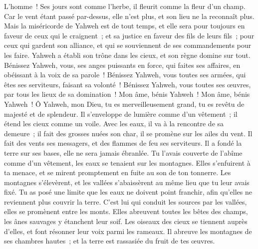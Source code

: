 \begin{multicols}{2}
L'homme~! Ses jours sont comme l'herbe, il fleurit comme la fleur d'un champ.
Car le vent étant passé par-dessus, elle n'est plus, et son lieu ne la reconnaît plus.
Mais la miséricorde de Yahweh est de tout temps, et elle sera pour toujours en faveur de ceux qui le craignent~; et sa justice en faveur des fils de leurs fils~;
pour ceux qui gardent son alliance, et qui se souviennent de ses commandements pour les faire.
Yahweh a établi son trône dans les cieux, et son règne domine sur tout.
Bénissez Yahweh, vous, ses anges puissants en force, qui faites ses affaires, en obéissant à la voix de sa parole~!
Bénissez Yahweh, vous toutes ses armées, qui êtes ses serviteurs, faisant sa volonté~!
Bénissez Yahweh, vous toutes ses œuvres, par tous les lieux de sa domination~! Mon âme, bénis Yahweh~!
\VerseOne{}Mon âme, bénis Yahweh~! Ô Yahweh, mon Dieu, tu es merveilleusement grand, tu es revêtu de majesté et de splendeur.
Il s'enveloppe de lumière comme d'un vêtement~; il étend les cieux comme un voile.
Avec les eaux, il va à la rencontre de sa demeure~; il fait des grosses nuées son char, il se promène sur les ailes du vent.
Il fait des vents ses messagers, et des flammes de feu ses serviteurs.
Il a fondé la terre sur ses bases, elle ne sera jamais ébranlée.
Tu l'avais couverte de l'abîme comme d'un vêtement, les eaux se tenaient sur les montagnes.
Elles s'enfuirent à ta menace, et se mirent promptement en fuite au son de ton tonnerre.
Les montagnes s'élevèrent, et les vallées s'abaissèrent au même lieu que tu leur avais fixé.
Tu as posé une limite que les eaux ne doivent point franchir, afin qu'elles ne reviennent plus couvrir la terre.
C'est lui qui conduit les sources par les vallées, elles se promènent entre les monts.
Elles abreuvent toutes les bêtes des champs, les ânes sauvages y étanchent leur soif.
Les oiseaux des cieux se tiennent auprès d'elles, et font résonner leur voix parmi les rameaux.
Il abreuve les montagnes de ses chambres hautes~; et la terre est rassasiée du fruit de tes œuvres.

\end{multicols}
